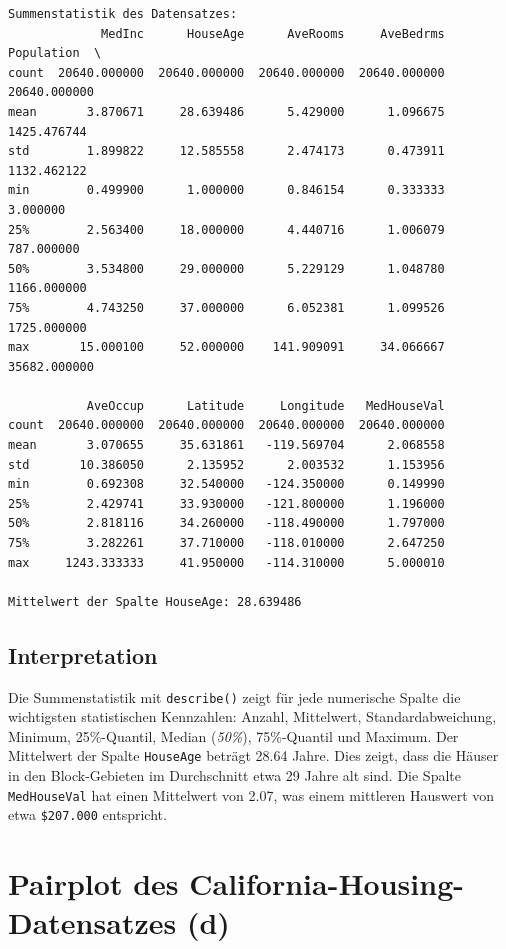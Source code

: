 \begin{verbatim}
Summenstatistik des Datensatzes:
             MedInc      HouseAge      AveRooms     AveBedrms    Population  \
count  20640.000000  20640.000000  20640.000000  20640.000000  20640.000000   
mean       3.870671     28.639486      5.429000      1.096675   1425.476744   
std        1.899822     12.585558      2.474173      0.473911   1132.462122   
min        0.499900      1.000000      0.846154      0.333333      3.000000   
25%        2.563400     18.000000      4.440716      1.006079    787.000000   
50%        3.534800     29.000000      5.229129      1.048780   1166.000000   
75%        4.743250     37.000000      6.052381      1.099526   1725.000000   
max       15.000100     52.000000    141.909091     34.066667  35682.000000   

           AveOccup      Latitude     Longitude   MedHouseVal  
count  20640.000000  20640.000000  20640.000000  20640.000000  
mean       3.070655     35.631861   -119.569704      2.068558  
std       10.386050      2.135952      2.003532      1.153956  
min        0.692308     32.540000   -124.350000      0.149990  
25%        2.429741     33.930000   -121.800000      1.196000  
50%        2.818116     34.260000   -118.490000      1.797000  
75%        3.282261     37.710000   -118.010000      2.647250  
max     1243.333333     41.950000   -114.310000      5.000010  

Mittelwert der Spalte HouseAge: 28.639486
\end{verbatim}

\subsection{Interpretation}

Die Summenstatistik mit \texttt{describe()} zeigt für jede numerische Spalte die wichtigsten statistischen Kennzahlen: Anzahl, Mittelwert, Standardabweichung, Minimum, 25\%-Quantil, Median (\textit{50\%}), 75\%-Quantil und Maximum. Der Mittelwert der Spalte \texttt{HouseAge} beträgt 28.64 Jahre. Dies zeigt, dass die Häuser in den Block-Gebieten im Durchschnitt etwa 29 Jahre alt sind. Die Spalte \texttt{MedHouseVal} hat einen Mittelwert von 2.07, was einem mittleren Hauswert von etwa \texttt{\$207.000} entspricht.

\cleardoublepage


\section{Pairplot des California-Housing-Datensatzes (d)}
\label{sec:2d}

